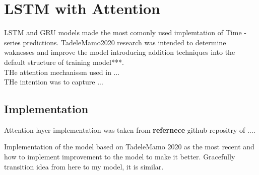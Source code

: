 \section{LSTM with Attention}\label{sec:lstm-attention}
LSTM and GRU models made the most comonly used implemtation of Time -series predictions. TadeleMamo2020 research was intended to determine waknesses and improve the model introducing addition techniques into the default structure of training model***. \\
THe attention mechanissm used in ... \\
THe intention was to capture ... \\
\subsection{Implementation}
    Attention layer implementation was taken from \textbf{refernece} github repositry of ....
    
Implementation of the model based on TadeleMamo 2020 as the most recent and how to implement improvement to the model to make it better. Gracefully transition idea from here to my model, it is similar.